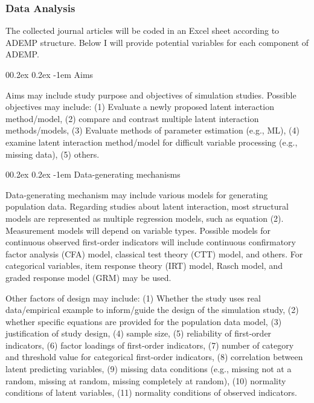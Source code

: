 \documentclass[
  11pt,
  man]{apa6}
\makeatletter
\let\oldparagraph\paragraph
\renewcommand{\paragraph}[1]{\oldparagraph{#1}\mbox{}}
\renewcommand{\paragraph}{\@startsection{paragraph}{4}{\parindent}%
  {0\baselineskip \@plus 0.2ex \@minus 0.2ex}%
  {-1em}%
  {\normalfont\normalsize\bfseries\itshape\typesectitle}}
\makeatother
\begin{document}
\hypertarget{data-analysis}{%
\subsubsection{Data Analysis}\label{data-analysis}}

The collected journal articles will be coded in an Excel sheet according to ADEMP structure. Below I will provide potential variables for each component of ADEMP.

\hypertarget{aims}{%
\paragraph{Aims}\label{aims}}

Aims may include study purpose and objectives of simulation studies. Possible objectives may include: (1) Evaluate a newly proposed latent interaction method/model, (2) compare and contrast multiple latent interaction methods/models, (3) Evaluate methods of parameter estimation (e.g., ML), (4) examine latent interaction method/model for difficult variable processing (e.g., missing data), (5) others.

\hypertarget{data-generating-mechanisms}{%
\paragraph{Data-generating mechanisms}\label{data-generating-mechanisms}}

Data-generating mechanism may include various models for generating population data. Regarding studies about latent interaction, most structural models are represented as multiple regression models, such as equation (2). Measurement models will depend on variable types. Possible models for continuous observed first-order indicators will include continuous confirmatory factor analysis (CFA) model, classical test theory (CTT) model, and others. For categorical variables, item response theory (IRT) model, Rasch model, and graded response model (GRM) may be used.

Other factors of design may include: (1) Whether the study uses real data/empirical example to inform/guide the design of the simulation study, (2) whether specific equations are provided for the population data model, (3) justification of study design, (4) sample size, (5) reliability of first-order indicators, (6) factor loadings of first-order indicators, (7) number of category and threshold value for categorical first-order indicators, (8) correlation between latent predicting variables, (9) missing data conditions (e.g., missing not at a random, missing at random, missing completely at random), (10) normality conditions of latent variables, (11) normality conditions of observed indicators.
\end{document}
